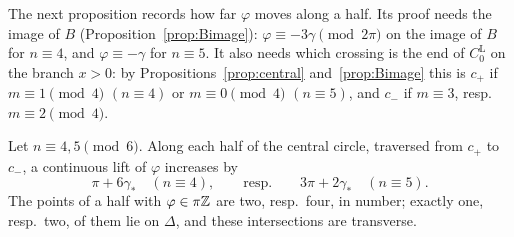 The next proposition records how far $\varphi$ moves along a half. Its proof needs the image of $B$
(Proposition~\ref{prop:Bimage}): $\varphi\equiv-3\gamma\pmod{2\pi}$ on the image of $B$ for $n\equiv4$, and $\varphi\equiv-\gamma$ for $n\equiv5$. It also needs which
crossing is the end of $C_0^{\mathrm L}$ on the branch $x>0$: by Propositions~\ref{prop:central} and~\ref{prop:Bimage} this is $c_+$
if $m\equiv1\pmod4$ $(n\equiv4)$ or $m\equiv0\pmod4$ $(n\equiv5)$, and $c_-$ if $m\equiv3$, resp.\ $m\equiv2\pmod4$.

\begin{proposition}\label{prop:deltaphi}
Let $n\equiv4,5\pmod6$. Along each half of the central circle, traversed from $c_+$ to $c_-$, a continuous lift of $\varphi$
increases by
\[
\pi+6\gamma_*\quad(n\equiv4),\qquad\text{resp.}\qquad 3\pi+2\gamma_*\quad(n\equiv5).
\]
The points of a half with $\varphi\in\pi\mathbb{Z}$ are two, resp.\ four, in number; exactly one, resp.\ two, of them lie on $\Delta$,
and these intersections are transverse.
\end{proposition}

